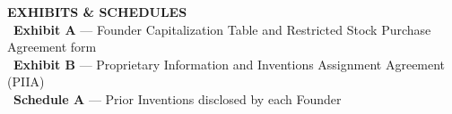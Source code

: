 \vspace{0.5em}

\begin{tcolorbox}[
  colback=founderbg,
  colframe=founderslate,
  arc=1mm,
  boxrule=0.6pt,
  leftrule=2pt,
  boxsep=8pt,
  left=10pt,right=10pt,top=8pt,bottom=8pt
]
{\sffamily\bfseries\footnotesize\color{founderink} EXHIBITS \& SCHEDULES}\\[4pt]
{\sffamily\footnotesize\color{founderslate}
\faFile\ \textbf{Exhibit A} --- Founder Capitalization Table and Restricted Stock Purchase Agreement form \\
\faLock\ \textbf{Exhibit B} --- Proprietary Information and Inventions Assignment Agreement (PIIA) \\
\faPen\ \textbf{Schedule A} --- Prior Inventions disclosed by each Founder
}
\end{tcolorbox}

